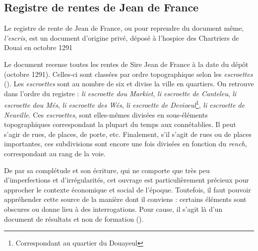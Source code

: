 \subsection{Registre de rentes de Jean de France}
Le registre de rente de Jean de France, ou pour reprendre du document même, \textit{l'escris}, est un document d'origine privé, déposé à l'hospice des Chartriers de Douai en octobre 1291 

Le document recense toutes les rentes de Sire Jean de France à la date du dépôt (octobre 1291). Celles-ci sont classées par ordre topographique selon les \textit{escroettes} (\cite{espinas_les_1933}). Les \textit{escroettes} sont au nombre de six et divise la ville en quartiers. On retrouve dans l'ordre du registre : \textit{li escroette dou Markiet}, \textit{li escroette de Canteleu}, \textit{li escroette dou Més}, \textit{li escroette des Wés}, \textit{li escroette de Devioeul}\footnote{ Correspondant au quartier du Douayeul}, \textit{li escroette de Neuville}.
Ces \textit{escroettes}, sont elles-mêmes divisées en sous-éléments topographiques correspondant la plupart du temps aux connétablies. Il peut s'agir de rues, de places, de porte, etc. Finalement, s'il s'agit de rues ou de places importantes, ces subdivisions sont encore une fois divisées en fonction du \textit{rench}, correspondant au rang de la voie.

De par sa complétude et son écriture, qui ne comporte que très peu d'imperfections et d'irrégularités, cet ouvrage est particulièrement précieux pour approcher le contexte économique et social de l'époque. 
Toutefois, il faut pouvoir appréhender cette source de la manière dont il conviens : certains éléments sont obscures ou donne lieu à des interrogations. Pour cause, il s'agit là d'un document de résultats et non de formation (\cite{espinas_les_1933}).


